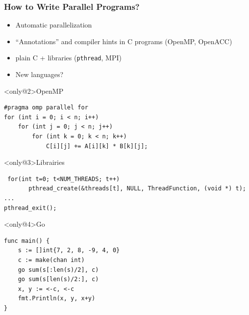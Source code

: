 \documentclass[xcolor={x11names,svgnames,psnames}]{beamer}
\newcommand{\red}{\alert}
\begin{document}
\begin{frame}[fragile]
  \frametitle{How to Write Parallel Programs?}

  \begin{itemize}
  \item<1-> Automatic parallelization
  \item<2-> ``Annotations'' and compiler hints in C programs  (\red{OpenMP}, OpenACC)
  \item<3-> plain C + libraries (\texttt{pthread}, \red{MPI})
  \item<4-> New languages?
  \end{itemize}

  \medskip

  \begin{overlayarea}{\textwidth}{5cm}
  \begin{block}<only@2>{OpenMP}
\begin{verbatim}
#pragma omp parallel for
for (int i = 0; i < n; i++)
    for (int j = 0; j < n; j++)
        for (int k = 0; k < n; k++)
            C[i][j] += A[i][k] * B[k][j];
\end{verbatim}
  \end{block}


  \begin{block}<only@3>{Librairies}
\begin{verbatim}
 for(int t=0; t<NUM_THREADS; t++)
       pthread_create(&threads[t], NULL, ThreadFunction, (void *) t);
...
pthread_exit();
\end{verbatim}
  \end{block}

  \begin{block}<only@4>{Go}
\begin{verbatim}
func main() {
    s := []int{7, 2, 8, -9, 4, 0}
    c := make(chan int)
    go sum(s[:len(s)/2], c)
    go sum(s[len(s)/2:], c)
    x, y := <-c, <-c
    fmt.Println(x, y, x+y)
}
\end{verbatim}
  \end{block}
\end{overlayarea}
\end{frame}


\end{document}
